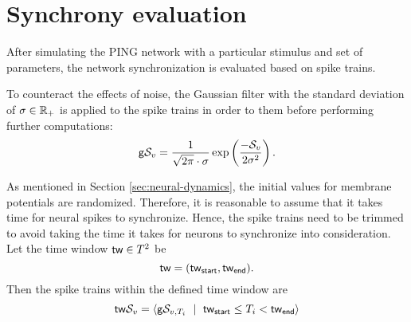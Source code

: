 \section{Synchrony evaluation}
\label{sec:sync-evaluation}

After simulating the PING network with a particular stimulus and set of parameters, the network synchronization is evaluated based on spike trains.

To counteract the effects of noise, the Gaussian filter with the standard deviation of $\sigma \in \mathbb{R}_+$ is applied to the spike trains in order to  them before performing further computations:
\begin{equation}
    \mathsf{g}\mathcal{S}_v = \frac{1}{\sqrt{2 \pi} \cdot \sigma} \exp \left( 
        \frac{-\mathcal{S}_v}{2 \sigma^2}
    \right).
\end{equation}

As mentioned in Section \ref{sec:neural-dynamics}, the initial values for membrane potentials are randomized. Therefore, it is reasonable to assume that it takes time for neural spikes to synchronize. Hence, the spike trains need to be trimmed to avoid taking the time it takes for neurons to synchronize into consideration. Let the time window $\mathsf{tw} \in T^2$ be
\begin{equation}
    \mathsf{tw} = (\mathsf{tw}_{\mathsf{start}}, \mathsf{tw}_{\mathsf{end}}).
\end{equation}
Then the spike trains within the defined time window are
\begin{equation}
    \mathsf{tw}\mathcal{S}_{v} = 
    \left<
        \mathsf{g}\mathcal{S}_{v, T_i}
        \ \mid \
        \mathsf{tw}_{\mathsf{start}} 
        \leq 
        T_i
        <
        \mathsf{tw}_{\mathsf{end}}
    \right>
\end{equation}

